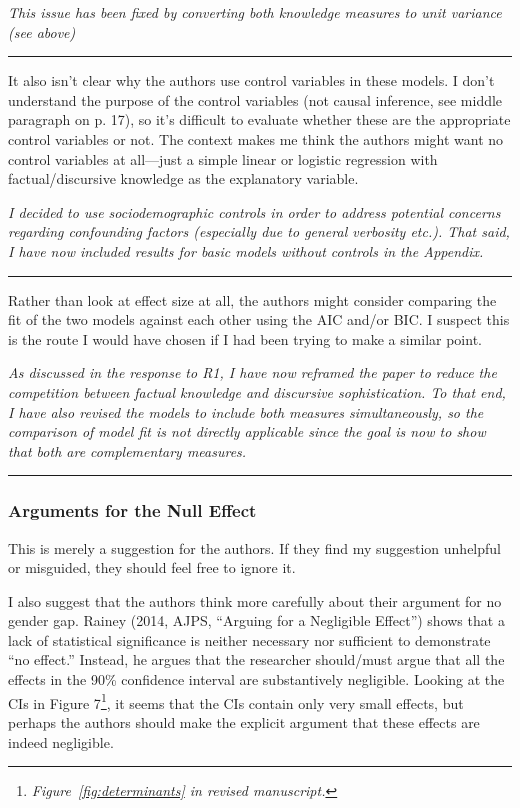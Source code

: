 \textit{This issue has been fixed by converting both knowledge measures to unit variance (see above)}


\rule{\linewidth}{.01cm}

It also isn’t clear why the authors use control variables in these models. I don’t understand the purpose of the control variables (not causal inference, see middle paragraph on p. 17), so it’s difficult to evaluate whether these are the appropriate control variables or not. The context makes me think the authors might want no control variables at all—just a simple linear or logistic regression with factual/discursive knowledge as the explanatory variable.

\textit{I decided to use sociodemographic controls in order to address potential concerns regarding confounding factors (especially due to general verbosity etc.). That said, I have now included results for basic models without controls in the Appendix.}


\rule{\linewidth}{.01cm}

Rather than look at effect size at all, the authors might consider comparing the fit of the two models against each other using the AIC and/or BIC. I suspect this is the route I would have chosen if I had been trying to make a similar point.

\textit{As discussed in the response to R1, I have now reframed the paper to reduce the competition between factual knowledge and discursive sophistication. To that end, I have also revised the models to include both measures simultaneously, so the comparison of model fit is not directly applicable since the goal is now to show that both are complementary measures.}


\rule{\linewidth}{.01cm}

\subsubsection*{Arguments for the Null Effect}

This is merely a suggestion for the authors. If they find my suggestion unhelpful or misguided, they should feel free to ignore it.

I also suggest that the authors think more carefully about their argument for no gender gap. Rainey (2014, AJPS, “Arguing for a Negligible Effect”) shows that a lack of statistical significance is neither necessary nor sufficient to demonstrate “no effect.” Instead, he argues that the researcher should/must argue that all the effects in the 90\% confidence interval are substantively negligible. Looking at the CIs in Figure 7\footnote{\textit{Figure~\ref{fig:determinants} in revised manuscript.}}, it seems that the CIs contain only very small effects, but perhaps the authors should make the explicit argument that these effects are indeed negligible.

